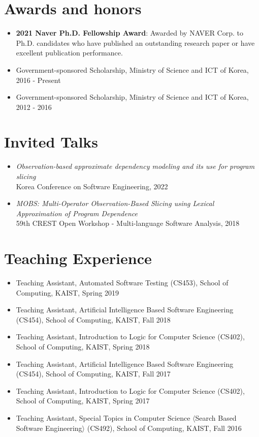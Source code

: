 \documentclass[letterpaper,11pt]{article}
\begin{document}
\section{Awards and honors}
  \begin{itemize}
    \item \textbf{2021 Naver Ph.D. Fellowship Award}: Awarded by NAVER Corp. to Ph.D. candidates who have published an outstanding research paper or have excellent publication performance.
    \item Government-sponsored Scholarship, Ministry of Science and ICT of Korea, 2016 - Present
    \item Government-sponsored Scholarship, Ministry of Science and ICT of Korea, 2012 - 2016
  \end{itemize}

\section{Invited Talks}
  \begin{itemize}
    \item \emph{Observation-based approximate dependency modeling and its use for program slicing} \\ Korea Conference on Software Engineering, 2022
    \item \emph{MOBS: Multi-Operator Observation-Based Slicing using Lexical Approximation of Program Dependence} \\ 59th CREST Open Workshop - Multi-language Software Analysis, 2018
  \end{itemize}

\section{Teaching Experience}
  \begin{itemize}
    \item Teaching Assistant, Automated Software Testing (CS453), School of Computing, KAIST, Spring 2019
    \item Teaching Assistant, Artificial Intelligence Based Software Engineering (CS454), School of Computing, KAIST, Fall 2018
    \item Teaching Assistant, Introduction to Logic for Computer Science (CS402), School of Computing, KAIST, Spring 2018
    \item Teaching Assistant, Artificial Intelligence Based Software Engineering (CS454), School of Computing, KAIST, Fall 2017
    \item Teaching Assistant, Introduction to Logic for Computer Science (CS402), School of Computing, KAIST, Spring 2017
    \item Teaching Assistant, Special Topics in Computer Science $\langle$Search Based Software Engineering$\rangle$ (CS492), School of Computing, KAIST, Fall 2016
    
  \end{itemize}
\end{document}
